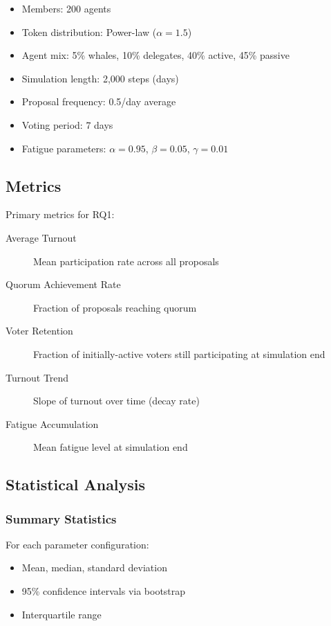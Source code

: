 \begin{itemize}
    \item Members: 200 agents
    \item Token distribution: Power-law ($\alpha = 1.5$)
    \item Agent mix: 5\% whales, 10\% delegates, 40\% active, 45\% passive
    \item Simulation length: 2,000 steps (days)
    \item Proposal frequency: 0.5/day average
    \item Voting period: 7 days
    \item Fatigue parameters: $\alpha=0.95$, $\beta=0.05$, $\gamma=0.01$
\end{itemize}

\subsection{Metrics}

Primary metrics for RQ1:

\begin{description}
    \item[Average Turnout] Mean participation rate across all proposals
    \item[Quorum Achievement Rate] Fraction of proposals reaching quorum
    \item[Voter Retention] Fraction of initially-active voters still participating at simulation end
    \item[Turnout Trend] Slope of turnout over time (decay rate)
    \item[Fatigue Accumulation] Mean fatigue level at simulation end
\end{description}

\subsection{Statistical Analysis}

\subsubsection{Summary Statistics}

For each parameter configuration:
\begin{itemize}
    \item Mean, median, standard deviation
    \item 95\% confidence intervals via bootstrap
    \item Interquartile range
\end{itemize}

